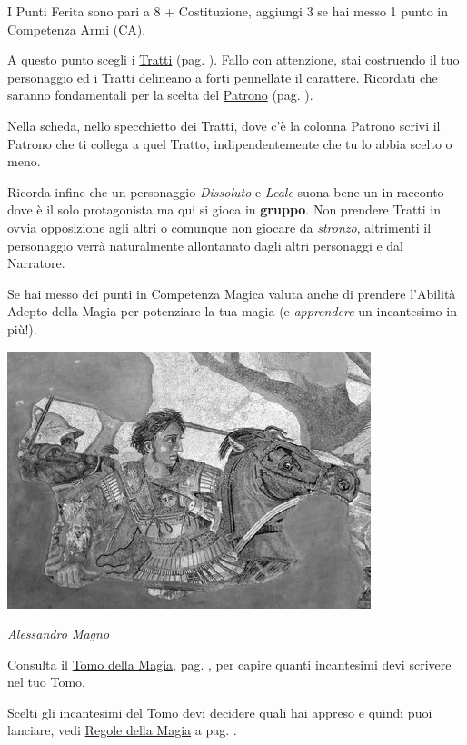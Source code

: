 \begin{multicols}{2}
I Punti Ferita sono pari a 8 + Costituzione, aggiungi 3 se hai messo 1 punto in Competenza Armi (CA).

A questo punto scegli i \hyperlink{tratti}{Tratti} (pag. \pageref{tratti}). Fallo con attenzione, stai costruendo il tuo personaggio ed i Tratti delineano a forti pennellate il carattere. Ricordati che saranno fondamentali per la scelta del \hyperlink{patroni}{Patrono} (pag. \pageref{patroni}).

Nella scheda, nello specchietto dei Tratti, dove c'è la colonna Patrono scrivi il Patrono che ti collega a quel Tratto, indipendentemente che tu lo abbia scelto o meno.

Ricorda infine che un personaggio \emph{Dissoluto} e \emph{Leale} suona bene un in racconto dove è il solo protagonista ma qui si gioca in \textbf{gruppo}. Non prendere Tratti in ovvia opposizione agli altri o comunque non giocare da \emph{stronzo}, altrimenti il personaggio verrà naturalmente allontanato dagli altri personaggi e dal Narratore.

Se hai messo dei punti in Competenza Magica valuta anche di prendere l'Abilità Adepto della Magia per potenziare la tua magia (e \emph{apprendere} un incantesimo in più!).

\begin{center}
\includegraphics[width=0.85\linewidth]{immagini/Alexander_and_Bucephalus_-_Battle_of_Issus_mosaic.png}

\emph{Alessandro Magno}
\end{center}

Consulta il \hyperlink{tomocm1}{Tomo della Magia}, pag. \pageref{tomocm1}, per capire quanti incantesimi devi scrivere nel tuo Tomo.

Scelti gli incantesimi del Tomo devi decidere quali hai appreso e quindi puoi lanciare, vedi \hyperlink{incantesimicm1}{Regole della Magia} a pag. \pageref{incantesimicm1}.


\end{multicols}
